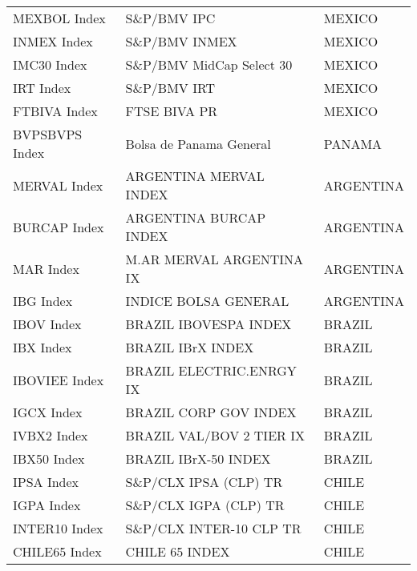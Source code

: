 \begin {table}[H]
\begin{center}
\begin{tabu}{| l l l |}
MEXBOL Index & S\&P/BMV IPC & MEXICO \\ 
INMEX Index & S\&P/BMV INMEX & MEXICO \\ 
IMC30 Index & S\&P/BMV MidCap Select 30 & MEXICO \\ 
IRT Index & S\&P/BMV IRT & MEXICO \\ 
FTBIVA Index & FTSE BIVA PR & MEXICO \\ 
BVPSBVPS Index & Bolsa de Panama General & PANAMA \\ 
MERVAL Index & ARGENTINA MERVAL INDEX & ARGENTINA \\ 
BURCAP Index & ARGENTINA BURCAP INDEX & ARGENTINA \\ 
MAR Index & M.AR MERVAL ARGENTINA IX & ARGENTINA \\ 
IBG Index & INDICE BOLSA GENERAL & ARGENTINA \\ 
IBOV Index & BRAZIL IBOVESPA INDEX & BRAZIL \\ 
IBX Index & BRAZIL IBrX INDEX & BRAZIL \\ 
IBOVIEE Index & BRAZIL ELECTRIC.ENRGY IX & BRAZIL \\ 
IGCX Index & BRAZIL CORP GOV INDEX & BRAZIL \\ 
IVBX2 Index & BRAZIL VAL/BOV 2 TIER IX & BRAZIL \\ 
IBX50 Index & BRAZIL IBrX-50 INDEX & BRAZIL \\ 
IPSA Index & S\&P/CLX IPSA (CLP) TR & CHILE \\ 
IGPA Index & S\&P/CLX IGPA (CLP) TR & CHILE \\ 
INTER10 Index & S\&P/CLX INTER-10 CLP TR & CHILE \\ 
CHILE65 Index & CHILE 65 INDEX & CHILE \\ 

\hline
\end{tabu}
\hspace*{-3cm}
\small
\end{center}
\end{table}

